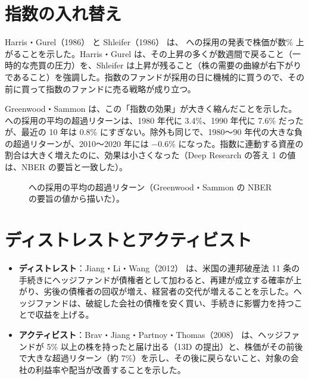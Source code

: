 \section{指数の入れ替え}

Harris・Gurel（1986）\cite{harrisgurel1986} と Shleifer（1986）\cite{shleifer1986} は、\SP{} への採用の発表で株価が数\% 上がることを示した。Harris・Gurel は、その上昇の多くが数週間で戻ること（一時的な売買の圧力）を、Shleifer は上昇が残ること（株の需要の曲線が右下がりであること）を強調した。指数のファンドが採用の日に機械的に買うので、その前に買って指数のファンドに売る戦略が成り立つ。

Greenwood・Sammon \cite{greenwoodsammon} は、この「指数の効果」が大きく縮んだことを示した。\SP{} への採用の平均の超過リターンは、1980 年代に 3.4\%、1990 年代に 7.6\% だったが、最近の 10 年は 0.8\% にすぎない。除外も同じで、1980〜90 年代の大きな負の超過リターンが、2010〜2020 年には $-0.6\%$ になった。指数に連動する資産の割合は大きく増えたのに、効果は小さくなった（Deep Research の答え 1 の値は、NBER の要旨と一致した）。

\begin{figure}[H]
\centering
{}
\caption{\SP{} への採用の平均の超過リターン（Greenwood・Sammon の NBER の要旨の値から描いた）。}
\label{fig:indexeffect}
\end{figure}

\section{ディストレストとアクティビスト}

\begin{itemize}
\item \textbf{ディストレスト}：Jiang・Li・Wang（2012）\cite{jlw2012} は、米国の連邦破産法 11 条の手続きにヘッジファンドが債権者として加わると、再建が成立する確率が上がり、劣後の債権者の回収が増え、経営者の交代が増えることを示した。ヘッジファンドは、破綻した会社の債権を安く買い、手続きに影響力を持つことで収益を上げる。
\item \textbf{アクティビスト}：Brav・Jiang・Partnoy・Thomas（2008）\cite{bjpt2008} は、ヘッジファンドが 5\% 以上の株を持ったと届け出る（13D の提出）と、株価がその前後で大きな超過リターン（約 7\%）を示し、その後に戻らないこと、対象の会社の利益率や配当が改善することを示した。
\end{itemize}

